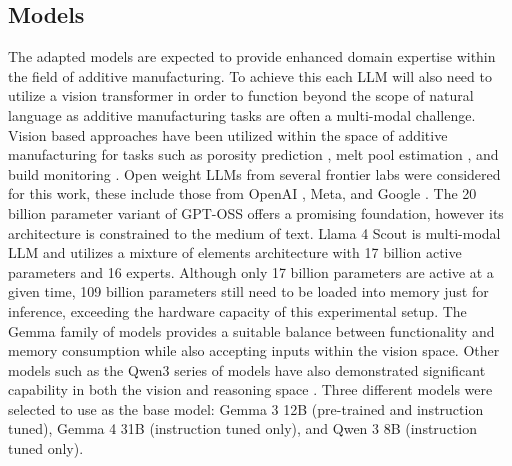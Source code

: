 \subsection{Models}
The adapted models are expected to provide enhanced domain expertise within the
field of additive manufacturing. To achieve this each LLM will also need to
utilize a vision transformer in order to function beyond the scope of natural
language as additive manufacturing tasks are often a multi-modal challenge.
Vision based approaches have been utilized within the space of additive
manufacturing for tasks such as porosity prediction \cite{pak_thermopore_2024,
bostan_accurate_2025}, melt pool estimation \cite{ogoke_deep_2024}, and build
monitoring \cite{jadhav_llm-3d_2025}. Open weight LLMs from several frontier
labs were considered for this work, these include those from OpenAI
\cite{openai_gpt-oss-120b_2025}, Meta, and Google \cite{team_gemma_2025}. The 20
billion parameter variant of GPT-OSS \cite{openai_gpt-oss-120b_2025} offers a
promising foundation, however its architecture is constrained to the medium of
text. Llama 4 Scout is multi-modal LLM and utilizes a mixture of elements
architecture with 17 billion active parameters and 16 experts. Although only 17
billion parameters are active at a given time, 109 billion parameters still need
to be loaded into memory just for inference, exceeding the hardware capacity of
this experimental setup. The Gemma family of models \cite{team_gemma_2025}
provides a suitable balance between functionality and memory consumption while
also accepting inputs within the vision space. Other models such as the Qwen3
series of models have also demonstrated significant capability in both the
vision and reasoning space \cite{yang_qwen3_2025}. Three different models were
selected to use as the base model: Gemma 3 12B (pre-trained and instruction
tuned), Gemma 4 31B (instruction tuned only), and Qwen 3 8B (instruction tuned
only).

